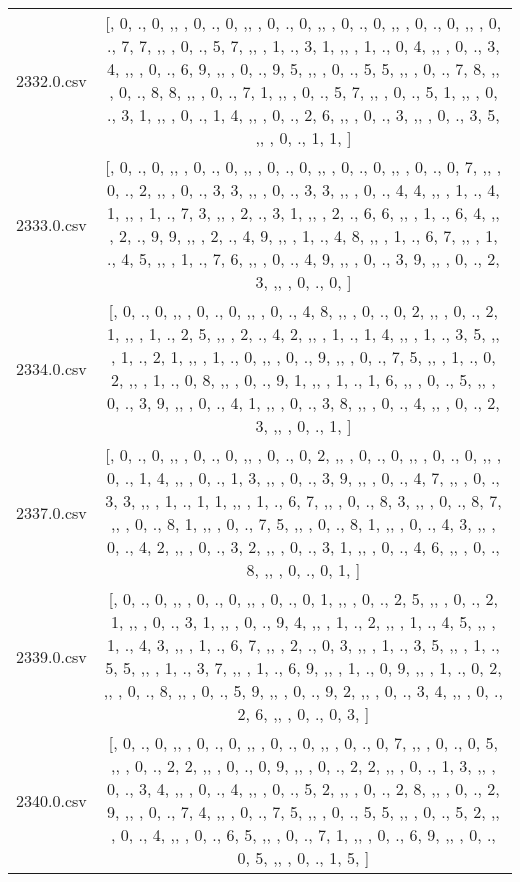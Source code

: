 \begin{table}[ht]
\begin{tabular}{@{}c c@{}}
	2332.0.csv & [, 0, ., 0, ,,  , 0, ., 0, ,,  , 0, ., 0, ,,  , 0, ., 0, ,,  , 0, ., 0, ,,  , 0, ., 7, 7, ,,  , 0, ., 5, 7, ,,  , 1, ., 3, 1, ,,  , 1, ., 0, 4, ,,  , 0, ., 3, 4, ,,  , 0, ., 6, 9, ,,  , 0, ., 9, 5, ,,  , 0, ., 5, 5, ,,  , 0, ., 7, 8, ,,  , 0, ., 8, 8, ,,  , 0, ., 7, 1, ,,  , 0, ., 5, 7, ,,  , 0, ., 5, 1, ,,  , 0, ., 3, 1, ,,  , 0, ., 1, 4, ,,  , 0, ., 2, 6, ,,  , 0, ., 3, ,,  , 0, ., 3, 5, ,,  , 0, ., 1, 1, ]\\ 
	2333.0.csv & [, 0, ., 0, ,,  , 0, ., 0, ,,  , 0, ., 0, ,,  , 0, ., 0, ,,  , 0, ., 0, 7, ,,  , 0, ., 2, ,,  , 0, ., 3, 3, ,,  , 0, ., 3, 3, ,,  , 0, ., 4, 4, ,,  , 1, ., 4, 1, ,,  , 1, ., 7, 3, ,,  , 2, ., 3, 1, ,,  , 2, ., 6, 6, ,,  , 1, ., 6, 4, ,,  , 2, ., 9, 9, ,,  , 2, ., 4, 9, ,,  , 1, ., 4, 8, ,,  , 1, ., 6, 7, ,,  , 1, ., 4, 5, ,,  , 1, ., 7, 6, ,,  , 0, ., 4, 9, ,,  , 0, ., 3, 9, ,,  , 0, ., 2, 3, ,,  , 0, ., 0, ]\\ 
	2334.0.csv & [, 0, ., 0, ,,  , 0, ., 0, ,,  , 0, ., 4, 8, ,,  , 0, ., 0, 2, ,,  , 0, ., 2, 1, ,,  , 1, ., 2, 5, ,,  , 2, ., 4, 2, ,,  , 1, ., 1, 4, ,,  , 1, ., 3, 5, ,,  , 1, ., 2, 1, ,,  , 1, ., 0, ,,  , 0, ., 9, ,,  , 0, ., 7, 5, ,,  , 1, ., 0, 2, ,,  , 1, ., 0, 8, ,,  , 0, ., 9, 1, ,,  , 1, ., 1, 6, ,,  , 0, ., 5, ,,  , 0, ., 3, 9, ,,  , 0, ., 4, 1, ,,  , 0, ., 3, 8, ,,  , 0, ., 4, ,,  , 0, ., 2, 3, ,,  , 0, ., 1, ]\\ 
	2337.0.csv & [, 0, ., 0, ,,  , 0, ., 0, ,,  , 0, ., 0, 2, ,,  , 0, ., 0, ,,  , 0, ., 0, ,,  , 0, ., 1, 4, ,,  , 0, ., 1, 3, ,,  , 0, ., 3, 9, ,,  , 0, ., 4, 7, ,,  , 0, ., 3, 3, ,,  , 1, ., 1, 1, ,,  , 1, ., 6, 7, ,,  , 0, ., 8, 3, ,,  , 0, ., 8, 7, ,,  , 0, ., 8, 1, ,,  , 0, ., 7, 5, ,,  , 0, ., 8, 1, ,,  , 0, ., 4, 3, ,,  , 0, ., 4, 2, ,,  , 0, ., 3, 2, ,,  , 0, ., 3, 1, ,,  , 0, ., 4, 6, ,,  , 0, ., 8, ,,  , 0, ., 0, 1, ]\\ 
	2339.0.csv & [, 0, ., 0, ,,  , 0, ., 0, ,,  , 0, ., 0, 1, ,,  , 0, ., 2, 5, ,,  , 0, ., 2, 1, ,,  , 0, ., 3, 1, ,,  , 0, ., 9, 4, ,,  , 1, ., 2, ,,  , 1, ., 4, 5, ,,  , 1, ., 4, 3, ,,  , 1, ., 6, 7, ,,  , 2, ., 0, 3, ,,  , 1, ., 3, 5, ,,  , 1, ., 5, 5, ,,  , 1, ., 3, 7, ,,  , 1, ., 6, 9, ,,  , 1, ., 0, 9, ,,  , 1, ., 0, 2, ,,  , 0, ., 8, ,,  , 0, ., 5, 9, ,,  , 0, ., 9, 2, ,,  , 0, ., 3, 4, ,,  , 0, ., 2, 6, ,,  , 0, ., 0, 3, ]\\ 
	2340.0.csv & [, 0, ., 0, ,,  , 0, ., 0, ,,  , 0, ., 0, ,,  , 0, ., 0, 7, ,,  , 0, ., 0, 5, ,,  , 0, ., 2, 2, ,,  , 0, ., 0, 9, ,,  , 0, ., 2, 2, ,,  , 0, ., 1, 3, ,,  , 0, ., 3, 4, ,,  , 0, ., 4, ,,  , 0, ., 5, 2, ,,  , 0, ., 2, 8, ,,  , 0, ., 2, 9, ,,  , 0, ., 7, 4, ,,  , 0, ., 7, 5, ,,  , 0, ., 5, 5, ,,  , 0, ., 5, 2, ,,  , 0, ., 4, ,,  , 0, ., 6, 5, ,,  , 0, ., 7, 1, ,,  , 0, ., 6, 9, ,,  , 0, ., 0, 5, ,,  , 0, ., 1, 5, ]\\ 

\end{tabular}
\end{table}
